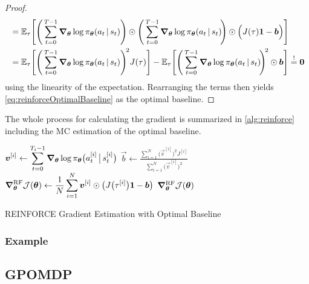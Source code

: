 \begin{proof}
\begin{align}
					 & = \mathbb{E}_\tau\Biggl[ \Biggl(\, \sum_{t = 0}^{T - 1} \grad_{\bm{\theta}} \log \pi_{\bm{\theta}}(a_t \,\vert\, s_t) \Biggr) \odot \Biggl(\, \sum_{t = 0}^{T - 1} \grad_{\bm{\theta}} \log \pi_{\bm{\theta}}(a_t \,\vert\, s_t) \!\Biggr) \odot \Bigl( J(\tau) \bm{1} - \bm{b} \Bigr) \Biggr]        \\
					 & = \mathbb{E}_\tau\Biggl[ \Biggl(\, \sum_{t = 0}^{T - 1} \grad_{\bm{\theta}} \log \pi_{\bm{\theta}}(a_t \,\vert\, s_t) \Biggr)^{\!2} J(\tau) \Biggr] - \mathbb{E}_\tau\Biggl[ \Biggl(\, \sum_{t = 0}^{T - 1} \grad_{\bm{\theta}} \log \pi_{\bm{\theta}}(a_t \,\vert\, s_t) \!\Biggr)^{\!2} \odot \bm{b} \Biggr]
					\overset{!}{=} \bm{0}
				\end{align}
				using the linearity of the expectation. Rearranging the terms then yields \eqref{eq:reinforceOptimalBaseline} as the optimal baseline.
			\end{proof}

			The whole process for calculating the gradient is summarized in \autoref{alg:reinforce} including the \ac{MC} estimation of the optimal baseline.

			\begin{algorithm}  \DontPrintSemicolon
				\(\displaystyle \bm{v}^{[i]} \gets \sum_{t = 0}^{T_i - 1} \grad_{\bm{\theta}} \log \pi_{\bm{\theta}}\bigl( a_t^{[i]} \,\big\vert\, s_t^{[i]} \bigr) \) \;
				\(\displaystyle \vec{b} \gets \frac{\sum_{i = 1}^{N} \bigl(\vec{v}^{[i]}\bigr)^2 J^{[i]}}{\sum_{i = 1}^{N} \bigl(\vec{v}^{[i]}\bigr)^2} \)  \quad{}
				\(\displaystyle \grad_{\bm{\theta}}^\mathrm{RF} \mathcal{J}(\bm{\theta}) \gets \frac{1}{N} \sum_{i = 1}^{N} \bm{v}^{[i]} \odot \bigl( J\bigl(\tau^{[i]}\bigr) \bm{1} - \bm{b} \bigr) \)  \quad{}
				\Return \( \grad_{\bm{\theta}}^\mathrm{RF} \mathcal{J}(\bm{\theta}) \) \;
				\caption{REINFORCE Gradient Estimation with Optimal Baseline}
				\label{alg:reinforce}
			\end{algorithm}

			\subsubsection{Example}

		\subsection{\acs{GPOMDP}}
			\label{subsec:gpomdp}

